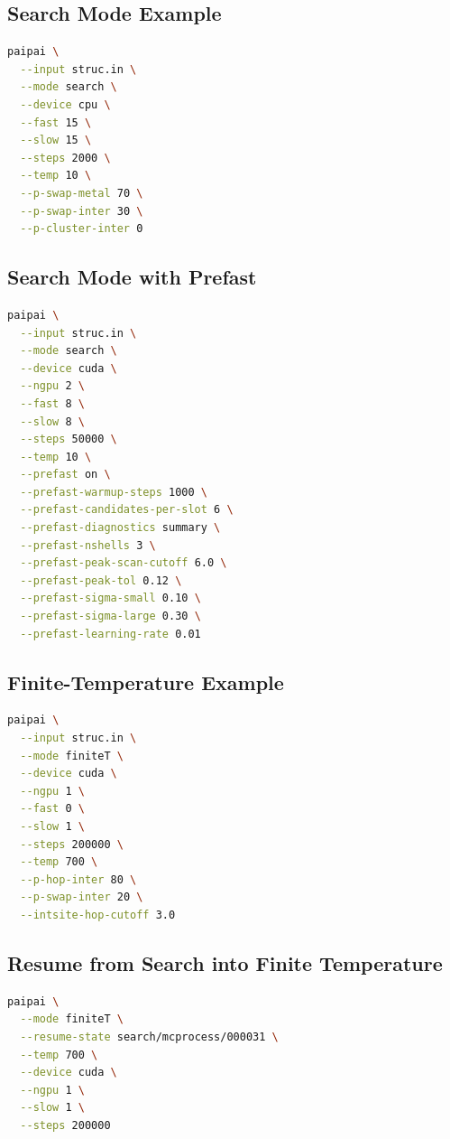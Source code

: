 \documentclass[11pt]{article}
\begin{document}
\subsection{Search Mode Example}

\begin{lstlisting}[language=bash]
paipai \
  --input struc.in \
  --mode search \
  --device cpu \
  --fast 15 \
  --slow 15 \
  --steps 2000 \
  --temp 10 \
  --p-swap-metal 70 \
  --p-swap-inter 30 \
  --p-cluster-inter 0
\end{lstlisting}

\subsection{Search Mode with Prefast}

\begin{lstlisting}[language=bash]
paipai \
  --input struc.in \
  --mode search \
  --device cuda \
  --ngpu 2 \
  --fast 8 \
  --slow 8 \
  --steps 50000 \
  --temp 10 \
  --prefast on \
  --prefast-warmup-steps 1000 \
  --prefast-candidates-per-slot 6 \
  --prefast-diagnostics summary \
  --prefast-nshells 3 \
  --prefast-peak-scan-cutoff 6.0 \
  --prefast-peak-tol 0.12 \
  --prefast-sigma-small 0.10 \
  --prefast-sigma-large 0.30 \
  --prefast-learning-rate 0.01
\end{lstlisting}

\subsection{Finite-Temperature Example}

\begin{lstlisting}[language=bash]
paipai \
  --input struc.in \
  --mode finiteT \
  --device cuda \
  --ngpu 1 \
  --fast 0 \
  --slow 1 \
  --steps 200000 \
  --temp 700 \
  --p-hop-inter 80 \
  --p-swap-inter 20 \
  --intsite-hop-cutoff 3.0
\end{lstlisting}

\subsection{Resume from Search into Finite Temperature}

\begin{lstlisting}[language=bash]
paipai \
  --mode finiteT \
  --resume-state search/mcprocess/000031 \
  --temp 700 \
  --device cuda \
  --ngpu 1 \
  --slow 1 \
  --steps 200000
\end{lstlisting}
\end{document}

